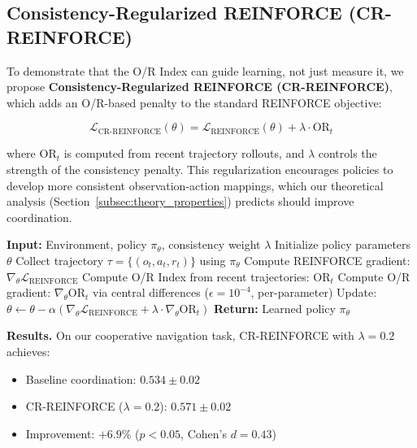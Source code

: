 \documentclass[twoside]{article}
\theoremstyle{remark}
\begin{document}
\subsection{Consistency-Regularized REINFORCE (CR-REINFORCE)}
\label{subsec:cr_reinforce}

To demonstrate that the O/R Index can guide learning, not just measure it, we propose \textbf{Consistency-Regularized REINFORCE (CR-REINFORCE)}, which adds an O/R-based penalty to the standard REINFORCE objective:

\begin{equation}
\mathcal{L}_{\text{CR-REINFORCE}}(\theta) = \mathcal{L}_{\text{REINFORCE}}(\theta) + \lambda \cdot \text{OR}_t
\label{eq:cr_reinforce}
\end{equation}

where $\text{OR}_t$ is computed from recent trajectory rollouts, and $\lambda$ controls the strength of the consistency penalty. This regularization encourages policies to develop more consistent observation-action mappings, which our theoretical analysis (Section~\ref{subsec:theory_properties}) predicts should improve coordination.

\begin{algorithm}[t]
\caption{Consistency-Regularized REINFORCE (CR-REINFORCE)}
\label{alg:cr_reinforce}
\begin{algorithmic}[1]
\State \textbf{Input:} Environment, policy $\pi_\theta$, consistency weight $\lambda$
\State Initialize policy parameters $\theta$
    \State Collect trajectory $\tau = \{(o_t, a_t, r_t)\}$ using $\pi_\theta$
    \State Compute REINFORCE gradient: $\nabla_\theta \mathcal{L}_{\text{REINFORCE}}$
    \State Compute O/R Index from recent trajectories: $\text{OR}_t$
    \State Compute O/R gradient: $\nabla_\theta \text{OR}_t$ via central differences ($\epsilon = 10^{-4}$, per-parameter)
    \State Update: $\theta \leftarrow \theta - \alpha (\nabla_\theta \mathcal{L}_{\text{REINFORCE}} + \lambda \cdot \nabla_\theta \text{OR}_t)$
\EndFor
\State \textbf{Return:} Learned policy $\pi_\theta$
\end{algorithmic}
\end{algorithm}

\textbf{Results.} On our cooperative navigation task, CR-REINFORCE with $\lambda = 0.2$ achieves:

\begin{itemize}
    \item Baseline coordination: $0.534 \pm 0.02$
    \item CR-REINFORCE ($\lambda = 0.2$): $0.571 \pm 0.02$
    \item Improvement: $+6.9\%$ ($p < 0.05$, Cohen's $d = 0.43$)
\end{itemize}
\end{document}

